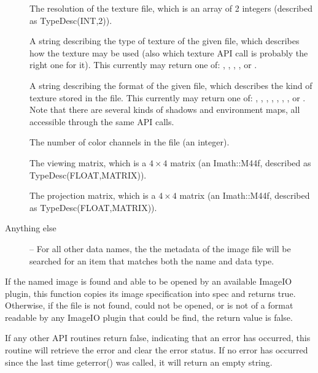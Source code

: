 \begin{description}
\item[\spc] \spc
\vspace{-12pt} \item[\rm {}] The resolution of the texture file, which
is an array of 2 integers (described as {\cf TypeDesc(INT,2)}).

\item[\rm {}] A string describing the type of texture
of the given file, which describes how the texture may be used (also
which texture API call is probably the right one for it).
This currently may return one of: , ,
, , 
or .

\item[\rm {}] A string describing the format of the
given file, which describes the kind of texture stored in the file.
This currently may return one of: , ,
, , , , , or .
Note that there are several kinds of shadows and environment maps,
all accessible through the same API calls.

\item[\rm {}] The number of color channels in the file 
(an integer).

\item[\rm {}] The viewing matrix, which is a
$4 \times 4$ matrix (an {\cf Imath::M44f}, described as {\cf
  TypeDesc(FLOAT,MATRIX)}).

\item[\rm {}] The projection matrix, which is a
$4 \times 4$ matrix (an {\cf Imath::M44f}, described as {\cf
  TypeDesc(FLOAT,MATRIX)}).

\item[Anything else] -- For all other data names, the
the metadata of the image file will be searched for an item that
matches both the name and data type.

\end{description}
\apiend


If the named image is found and able to be opened by an available
ImageIO plugin, this function copies its image specification into
{\cf spec} and returns {\cf true}.  Otherwise, if the file is not
found, could not be opened, or is not of a format readable by any
ImageIO plugin that could be find, the return value is {\cf false}.
\apiend


If any other API routines return {\cf false}, indicating that an
error has occurred, this routine will retrieve the error and clear
the error status.  If no error has occurred since the last time
{\cf geterror()} was called, it will return an empty string.
\apiend



\chapwidthend
